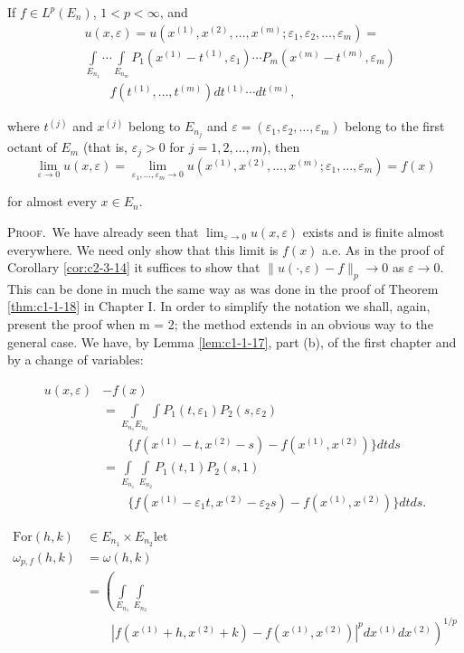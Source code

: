 \begin{theorem}
\label{thm:c2-3-22}
If $f \in L^p(E_n)$, $1 < p < \infty$, and
\[
\begin{aligned}&u(x,\varepsilon)=u(x^{(1)},x^{(2)},\ldots,x^{(m)};\varepsilon_{1},\varepsilon_{2},\ldots,\varepsilon_{m})=\\ &\int\limits_{E_{n_{1}}}\cdots\int\limits_{E_{n_{m}}}P_{1}(x^{(1)}-t^{(1)},\varepsilon_{1})\cdots P_{m}(x^{(m)}-t^{(m)},\varepsilon_{m})\\&\qquad f(t^{(1)},\ldots,t^{(m)})dt^{(1)}\cdots dt^{(m)},\end{aligned}
\]

where $t^{(j)}$ and $x^{(j)}$ belong to $E_{n_j}$ and $\varepsilon = (\varepsilon_1, \varepsilon_2, \ldots, \varepsilon_m)$ belong to the first octant of $E_m$ (that is, $\varepsilon_j > 0$ for $j = 1,2, \ldots, m$), then
\[
\lim_{\varepsilon\to0}u(x,\varepsilon)=\lim_{\varepsilon_{1},\ldots,\varepsilon_{m}\to0}u(x^{(1)},x^{(2)},\ldots,x^{(m)};\varepsilon_{1},\ldots,\varepsilon_{m})=f(x)
\]

for almost every $x \in E_n$.
\end{theorem}

\textsc{Proof.}\ We have already seen that $\lim_{\varepsilon \to 0} u(x, \varepsilon)$ exists and is finite almost everywhere. We need only show that this limit is $f(x)$ a.e. As in the proof of Corollary \ref{cor:c2-3-14} it suffices to show that $\|u(\cdot, \varepsilon) - f\|_{p} \to 0$ as $\varepsilon \to 0$. This can be done in much the same way as was done in the proof of Theorem \ref{thm:c1-1-18} in Chapter I. In order to simplify the notation we shall, again, present the proof when m = 2; the method extends in an obvious way to the general case. We have, by Lemma \ref{lem:c1-1-17}, part (b), of the first chapter and by a change of variables:

\[
\begin{aligned}u(x,\varepsilon)&-f(x)\\&=\int\limits_{E_{n_{1}}E_{n_{2}}}\int P_{1}(t,\varepsilon_{1})P_{2}(s,\varepsilon_{2})\\&\qquad\{f(x^{(1)}-t,x^{(2)}-s)-f(x^{(1)},x^{(2)})\}dt ds\\&=\int\limits_{E_{n_{1}}}\int\limits_{E_{n_{2}}}P_{1}(t,1)P_{2}(s,1)\\&\qquad\{f(x^{(1)}-\varepsilon_{1}t,x^{(2)}-\varepsilon_{2}s)-f(x^{(1)},x^{(2)})\}dt ds.\end{aligned}
\]

\[
\begin{aligned}\text{For}(h,k)&\in E_{n_{1}}\times E_{n_{2}}\text{let}\\\omega_{p,f}(h,k)&=\omega(h,k)\\&=\left(\int\limits_{E_{n_{1}}}\int\limits_{E_{n_{2}}}\right.\\&\qquad\left.|f(x^{(1)}+h,x^{(2)}+k)-f(x^{(1)},x^{(2)})|^{p} dx^{(1)}dx^{(2)}\right)^{1/p}\end{aligned}
\]

